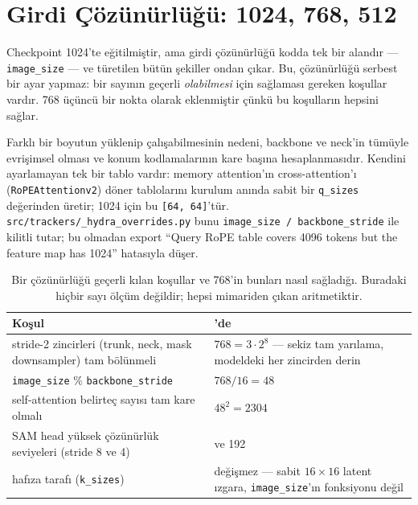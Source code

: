 \section{Girdi Çözünürlüğü: 1024, 768, 512}
\label{sec:cozunurluk}

Checkpoint 1024'te eğitilmiştir, ama girdi çözünürlüğü kodda tek bir
alandır --- \texttt{image\_size} --- ve türetilen bütün şekiller
ondan çıkar. Bu, çözünürlüğü serbest bir ayar yapmaz: bir sayının geçerli
\emph{olabilmesi} için sağlaması gereken koşullar vardır. 768 üçüncü bir
nokta olarak eklenmiştir çünkü bu koşulların hepsini sağlar.

Farklı bir boyutun yüklenip çalışabilmesinin nedeni, backbone ve neck'in
tümüyle evrişimsel olması ve konum kodlamalarının kare başına
hesaplanmasıdır. Kendini ayarlamayan tek bir tablo vardır: memory
attention'ın cross-attention'ı (\texttt{RoPEAttentionv2}) döner
tablolarını kurulum anında sabit bir \texttt{q\_sizes} değerinden
üretir; 1024 için bu \texttt{[64,\,64]}'tür.
\texttt{src/trackers/\_hydra\_overrides.py} bunu
\texttt{image\_size / backbone\_stride} ile kilitli tutar; bu olmadan
export ``Query RoPE table covers 4096 tokens but the feature map has
1024'' hatasıyla düşer.

\begin{table}[H]
  \centering
  \caption{Bir çözünürlüğü geçerli kılan koşullar ve 768'in bunları
    nasıl sağladığı. Buradaki hiçbir sayı ölçüm değildir; hepsi
    mimariden çıkan aritmetiktir.}
  \label{tab:cozunurluk-768}
  \small
  \begin{tabular}{@{}>{\raggedright\arraybackslash}p{72mm}>{\raggedright\arraybackslash}p{72mm}@{}}
    \toprule
    Koşul & 768'de \\
    \midrule
    stride-2 zincirleri (trunk, neck, mask downsampler) tam bölünmeli &
      $768 = 3\cdot2^{8}$ --- sekiz tam yarılama, modeldeki her
      zincirden derin \\
    \texttt{image\_size} \% \texttt{backbone\_stride} &
      $768/16 = 48$ \\
    self-attention belirteç sayısı tam kare olmalı & $48^{2} = 2304$ \\
    SAM head yüksek çözünürlük seviyeleri (stride 8 ve 4) & 96 ve 192 \\
    hafıza tarafı (\texttt{k\_sizes}) & değişmez --- sabit
      $16{\times}16$ latent ızgara, \texttt{image\_size}'ın fonksiyonu
      değil \\
    \bottomrule
  \end{tabular}
\end{table}

